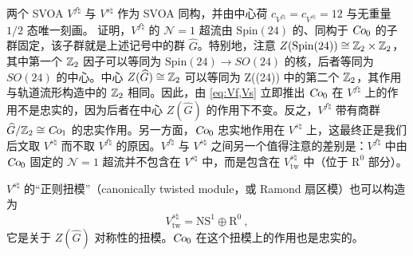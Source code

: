 两个 SVOA $V^{f\natural}$ 与 $V^{s\natural}$ 作为 SVOA 同构，并由中心荷 $c_{V^{f\natural}}=c_{V^{s\natural}}=12$ 与无重量 $1/2$ 态唯一刻画。\cite{DuncanJohnF.2007SfCl} 证明，$V^{f\natural}$ 的 $\mathcal{N}=1$ 超流由 $\text{Spin}(24)$ 的、同构于 $\operatorname{\textsl{Co}}_0$ 的子群固定，该子群就是上述记号中的群 $\widehat{G}$。特别地，注意 $Z(\text{Spin}(24))\cong\mathbb{Z}_2\times\mathbb{Z}_2$，其中第一个 $\mathbb{Z}_2$ 因子可以等同为 $\text{Spin}(24) \to SO(24)$ 的核，后者等同为 $SO(24)$ 的中心。中心 $Z(\widehat{G})\cong\mathbb{Z}_2$ 可以等同为 Z((24)) 中的第二个 $\mathbb{Z}_2$，其作用与轨道流形构造中的 $\mathbb{Z}_2$ 相同。因此，由 \eqref{eq:Vf,Vs} 立即推出 $\operatorname{\textsl{Co}}_0$ 在 $V^{f\natural}$ 上的作用不是忠实的，因为后者在中心 $Z(\widehat{G})$ 的作用下不变。反之，$V^{f\natural}$ 带有商群 $\widehat{G}/\mathbb{Z}_2\cong\operatorname{\textsl{Co}}_1$ 的忠实作用。另一方面，$\operatorname{\textsl{Co}}_0$ 忠实地作用在 $V^{s\natural}$ 上，这最终正是我们后文取 $V^{s\natural}$ 而不取 $V^{f\natural}$ 的原因。$V^{f\natural}$ 与 $V^{s\natural}$ 之间另一个值得注意的差别是：$V^{f\natural}$ 中由 $\operatorname{\textsl{Co}}_0$ 固定的 $\mathcal{N}=1$ 超流并不包含在 $V^{s\natural}$ 中，而是包含在 $V^{s\natural}_{\text{tw}}$ 中（位于 $\text{R}^0$ 部分）。


$V^{s\natural}$ 的“正则扭模”（canonically twisted module，或 Ramond 扇区模）也可以构造为
\begin{equation}
V^{s\natural}_{\text{tw}}=\text{NS}^1\oplus\text{R}^0~,
\end{equation}
它是关于 $Z(\widehat{G})$ 对称性的扭模。$\operatorname{\textsl{Co}}_0$ 在这个扭模上的作用也是忠实的。


